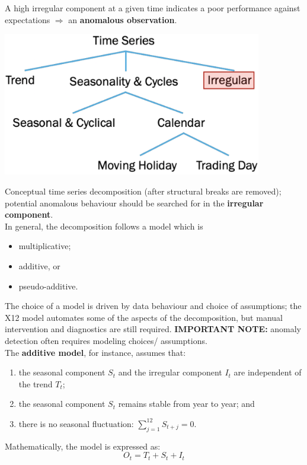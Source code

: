 \documentclass[20pt,landscape,footrule,headrule]{foils}
\newcommand{\newl}{\newline\newline}
\begin{document}
A high irregular component at a given time indicates a poor performance against expectations $\Longrightarrow$ an \textbf{anomalous observation}.  
\newpage
\begin{center}
\includegraphics[width=0.85\textwidth]{Images/decomposition_EN.png} \end{center} 
Conceptual time series decomposition (after structural breaks are removed); potential anomalous behaviour should be searched for in the \textbf{irregular component}.
\newpage\ \\ \noindent In general, the decomposition follows a model which is 
\begin{itemize} 
\item multiplicative;
\item additive, or 
\item pseudo-additive.
\end{itemize}
The choice of a model is driven by data behaviour and choice of assumptions; the X12 model automates some of the aspects of the decomposition, but manual intervention and diagnostics are still required.\newl
\textbf{IMPORTANT NOTE:} anomaly detection often requires modeling choices/ assumptions. 
\newpage\ \\ \noindent 
The \textbf{additive model}, for instance, assumes that: 
\begin{enumerate} \item the seasonal component $S_t$ and the irregular component $I_t$ are independent of the trend $T_t$; \item  the seasonal component $S_t$ remains stable from year to year; and \item there is no seasonal fluctuation: $\sum_{j=1}^{12} S_{t+j}=0 $.\end{enumerate} 
Mathematically, the model is expressed as:
    \begin{equation*}
        O_t = T_t + S_t + I_t
    \end{equation*}
\end{document}
